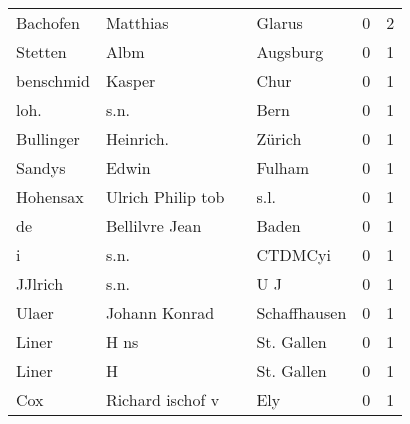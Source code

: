 \begin{tabular}{llllrr}
                 Bachofen &                           Matthias &             &                                      Glarus &          0 &         2 \\
                  Stetten &                               Albm &             &                                    Augsburg &          0 &         1 \\
                benschmid &                             Kasper &             &                                        Chur &          0 &         1 \\
                     loh. &                               s.n. &             &                                        Bern &          0 &         1 \\
                Bullinger &                          Heinrich. &             &                                      Zürich &          0 &         1 \\
                   Sandys &                              Edwin &             &                                      Fulham &          0 &         1 \\
                 Hohensax &                  Ulrich Philip tob &             &                                        s.l. &          0 &         1 \\
                       de &                     Bellilvre Jean &             &                                       Baden &          0 &         1 \\
                        i &                               s.n. &             &                                     CTDMCyi &          0 &         1 \\
                  JJlrich &                               s.n. &             &                                         U J &          0 &         1 \\
                    Ulaer &                      Johann Konrad &             &                                Schaffhausen &          0 &         1 \\
                    Liner &                               H ns &             &                                  St. Gallen &          0 &         1 \\
                    Liner &                                  H &             &                                  St. Gallen &          0 &         1 \\
                      Cox &                   Richard ischof v &             &                                         Ely &          0 &         1 \\

\end{tabular}

